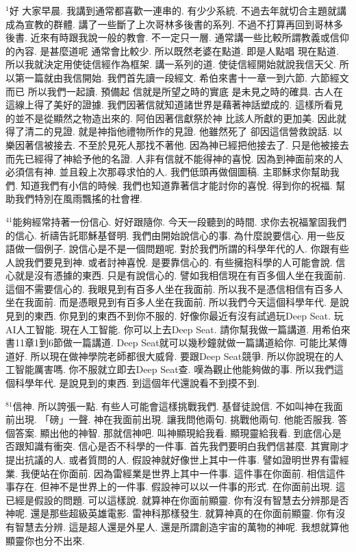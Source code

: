 \documentclass{book}
\begin{document}
$^{1}$好 大家早晨.
我講到通常都喜歡一連串的.
有少少系統.
不過去年就切合主題就講成為宣教的群體.
講了一些斷了上次哥林多後書的系列.
不過不打算再回到哥林多後書.
近來有時跟我說一般的教會.
不一定只一層.
通常講一些比較所謂教義或信仰的內容.
是甚麼道呢 通常會比較少.
所以既然老婆在點道.
即是人點唱 現在點道.
所以我就決定用使徒信經作為框架.
講一系列的道.
使徒信經開始就說我信天父.
所以第一篇就由我信開始.
我們首先讀一段經文.
希伯來書十一章一到六節.
六節經文而已 所以我們一起讀.
預備起 信就是所望之時的實底 是未見之時的確具.
古人在這線上得了美好的證據.
我們因著信就知道諸世界是藉著神話塑成的.
這樣所看見的並不是從顯然之物造出來的.
阿伯因著信獻祭於神 比該人所獻的更加美.
因此就得了清二的見證.
就是神指他禮物所作的見證.
他雖然死了 卻因這信營救說話.
以樂因著信被接去.
不至於見死人那找不著他.
因為神已經把他接去了.
只是他被接去而先已經得了神給予他的名證.
人非有信就不能得神的喜悅.
因為到神面前來的人必須信有神.
並且殺上次那尋求怕的人.
我們低頭再做個圖稿.
主耶穌求你幫助我們.
知道我們有小信的時候.
我們也知道靠著信才能討你的喜悅.
得到你的祝福.
幫助我們特別在風雨飄搖的社會裡.

$^{41}$能夠經常持著一份信心.
好好跟隨你.
今天一段聽到的時間.
求你去祝福鞏固我們的信心.
祈禱告託耶穌基督明.
我們由開始說信心的事.
為什麼說要信心.
用一些反語做一個例子.
說信心是不是一個問題呢.
對於我們所謂的科學年代的人.
你跟有些人說我們要見到神.
或者討神喜悅.
是要靠信心的.
有些擁抱科學的人可能會說.
信心就是沒有憑據的東西.
只是有說信心的.
譬如我相信現在有百多個人坐在我面前.
這個不需要信心的.
我眼見到有百多人坐在我面前.
所以我不是憑信相信有百多人坐在我面前.
而是憑眼見到有百多人坐在我面前.
所以我們今天這個科學年代.
是說見到的東西.
你見到的東西不到你不服的.
好像你最近有沒有試過玩Deep Seat.
玩AI人工智能.
現在人工智能.
你可以上去Deep Seat.
請你幫我做一篇講道.
用希伯來書11章1到6節做一篇講道.
Deep Seat就可以幾秒鐘就做一篇講道給你.
可能比某傳道好.
所以現在做神學院老師都很大威脅.
要跟Deep Seat競爭.
所以你說現在的人工智能厲害嗎.
你不服就立即去Deep Seat查.
嘆為觀止他能夠做的事.
所以我們這個科學年代.
是說見到的東西.
到這個年代還說看不到摸不到.

$^{81}$信神.
所以誇張一點.
有些人可能會這樣挑戰我們.
基督徒說信.
不如叫神在我面前出現.
「磅」一聲.
神在我面前出現.
讓我問他兩句.
挑戰他兩句.
他能否服我.
答個答案.
顯出他的神智.
那就信神吧.
叫神顯現給我看.
顯現靈給我看.
到底信心是否跟知識有衝突.
信心是否不科學的一件事.
首先我們要明白我們信甚麼.
其實剛才提出抗議的人.
或者質問的人.
假設神就好像世上其中一件事.
譬如證明世界有雷經業.
我便站在你面前.
因為雷經業是世界上其中一件事.
這件事在你面前.
相信這件事存在.
但神不是世界上的一件事.
假設神可以以一件事的形式.
在你面前出現.
這已經是假設的問題.
可以這樣說.
就算神在你面前顯靈.
你有沒有智慧去分辨那是否神呢.
還是那些超級英雄電影.
雷神科那樣發生.
就算神真的在你面前顯靈.
你有沒有智慧去分辨.
這是超人還是外星人.
還是所謂創造宇宙的萬物的神呢.
我想就算他顯靈你也分不出來.
\end{document}
